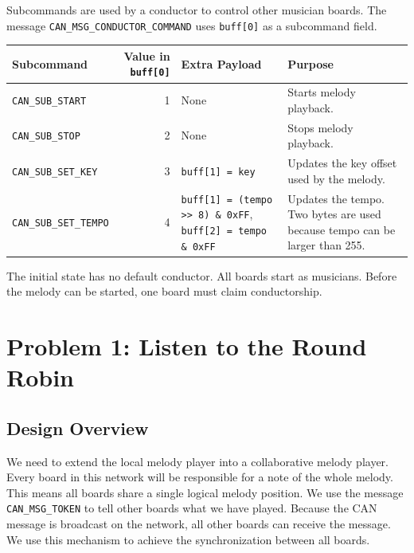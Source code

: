 \documentclass[11pt,a4paper]{article}
\begin{document}
Subcommands are used by a conductor to control other musician boards. The message \texttt{CAN\_\allowbreak{}MSG\_\allowbreak{}CONDUCTOR\_\allowbreak{}COMMAND} uses \texttt{buff[0]} as a subcommand field.

\begin{center}
\small
\setlength{\tabcolsep}{4pt}
\renewcommand{\arraystretch}{1.2}
\begin{tabularx}{\textwidth}{>{\raggedright\arraybackslash}p{}r>{\raggedright\arraybackslash}X>{\raggedright\arraybackslash}X}
\toprule
\textbf{Subcommand} & \textbf{Value in \texttt{buff[0]}} & \textbf{Extra Payload} & \textbf{Purpose} \\
\midrule
\texttt{CAN\_\allowbreak{}SUB\_\allowbreak{}START} & 1 & None & Starts melody playback. \\
\texttt{CAN\_\allowbreak{}SUB\_\allowbreak{}STOP} & 2 & None & Stops melody playback. \\
\texttt{CAN\_\allowbreak{}SUB\_\allowbreak{}SET\_\allowbreak{}KEY} & 3 & \texttt{buff[1] = key} & Updates the key offset used by the melody. \\
\texttt{CAN\_\allowbreak{}SUB\_\allowbreak{}SET\_\allowbreak{}TEMPO} & 4 & \texttt{buff[1] = (tempo \textgreater{}\textgreater{} 8) \& 0xFF}, \texttt{buff[2] = tempo \& 0xFF} & Updates the tempo. Two bytes are used because tempo can be larger than 255. \\
\bottomrule
\end{tabularx}
\end{center}

The initial state has no default conductor. All boards start as musicians. Before the melody can be started, one board must claim conductorship.

\section*{Problem 1: Listen to the Round Robin}

\subsection*{Design Overview}

We need to extend the local melody player into a collaborative melody player. Every board in this network will be responsible for a note of the whole melody. This means all boards share a single logical melody position. We use the message \texttt{CAN\_\allowbreak{}MSG\_\allowbreak{}TOKEN} to tell other boards what we have played. Because the CAN message is broadcast on the network, all other boards can receive the message. We use this mechanism to achieve the synchronization between all boards.
\end{document}
